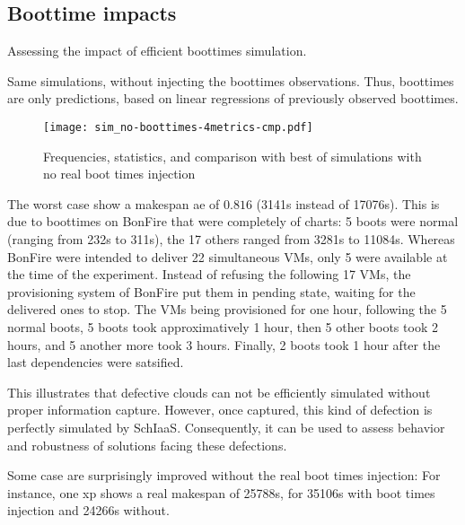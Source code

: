 \subsection{Boottime impacts}

Assessing the impact of efficient boottimes simulation.

Same simulations, without injecting the boottimes observations. 
Thus, boottimes are only predictions, based on linear regressions of previously
observed boottimes.

\begin{figure}
  \centering
  \texttt{[image: sim\_no-boottimes-4metrics-cmp.pdf]}

  

  

  

  \caption{Frequencies, statistics, and comparison with best of simulations with no real boot times 
  injection}

\end{figure} 

The worst case show a makespan ae of $0.816$ (3141s instead of 17076s). 
This is due to boottimes on BonFire that were completely of charts: 
5 boots were normal (ranging from 232s to 311s), 
the 17 others ranged from 3281s to 11084s.
Whereas BonFire were intended to deliver 22 simultaneous VMs, only 5 were available
at the time of the experiment. Instead of refusing the following 17 VMs, the
provisioning system of BonFire put them in pending state, waiting for the delivered
ones to stop. The VMs being provisioned for one hour, following the 5 normal boots, 
5 boots took approximatively 1 hour, then 5 other boots took 2 hours,
and 5 another more took 3 hours. Finally, 2 boots took 1 hour after the last 
dependencies were satsified.

This illustrates that defective clouds can not be efficiently simulated without 
proper information capture. However, once captured, this kind of defection is
perfectly simulated by SchIaaS. Consequently, it can be used to assess behavior 
and robustness of solutions facing these defections.

Some case are surprisingly improved without the real boot times injection:
For instance, one xp shows a real makespan of 25788s, for 35106s with boot times
injection and 24266s without. 




